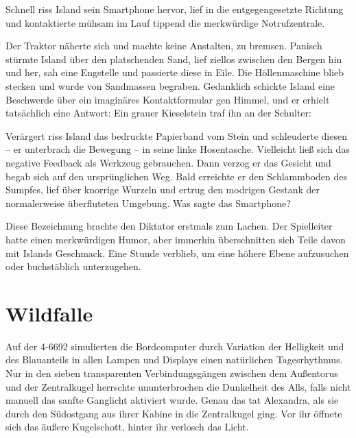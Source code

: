 Schnell riss Island sein Smartphone hervor, lief in die entgegengesetzte Richtung und kontaktierte mühsam im Lauf tippend die merkwürdige Notrufzentrale.


Der Traktor näherte sich und machte keine Anstalten, zu bremsen. Panisch stürmte Island über den platschenden Sand, lief ziellos zwischen den Bergen hin und her, sah eine Engstelle und passierte diese in Eile. Die Höllenmaschine blieb stecken und wurde von Sandmassen begraben. Gedanklich schickte Island eine Beschwerde über ein imaginäres Kontaktformular gen Himmel, und er erhielt tatsächlich eine Antwort: Ein grauer Kieselstein traf ihn an der Schulter: 

Verärgert riss Island das bedruckte Papierband vom Stein und schleuderte diesen – er unterbrach die Bewegung – in seine linke Hosentasche. Vielleicht ließ sich das negative Feedback als Werkzeug gebrauchen. Dann verzog er das Gesicht und begab sich auf den ursprünglichen Weg. Bald erreichte er den Schlammboden des Sumpfes, lief über knorrige Wurzeln und ertrug den modrigen Gestank der normalerweise überfluteten Umgebung. Was sagte das Smartphone?


Diese Bezeichnung brachte den Diktator erstmals zum Lachen. Der Spielleiter hatte einen merkwürdigen Humor, aber immerhin überschnitten sich Teile davon mit Islands Geschmack. Eine Stunde verblieb, um eine höhere Ebene aufzusuchen oder buchstäblich unterzugehen.


\chapter{Wildfalle}

Auf der 4-6692 simulierten die Bordcomputer durch Variation der Helligkeit und des Blauanteils in allen Lampen und Displays einen natürlichen Tagesrhythmus. Nur in den sieben transparenten Verbindungsgängen zwischen dem Außentorus und der Zentralkugel herrschte ununterbrochen die Dunkelheit des Alls, falls nicht manuell das sanfte Ganglicht aktiviert wurde. Genau das tat Alexandra, als sie durch den Südostgang aus ihrer Kabine in die Zentralkugel ging. Vor ihr öffnete sich das äußere Kugelschott, hinter ihr verlosch das Licht.

